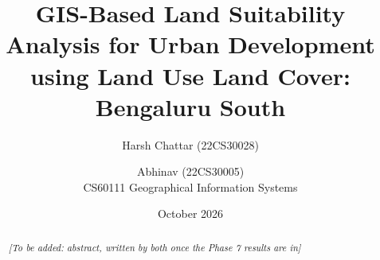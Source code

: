 \documentclass[11pt,a4paper]{article}
\title{GIS-Based Land Suitability Analysis for Urban Development\\
       using Land Use Land Cover: Bengaluru South}
\author{Harsh Chattar (22CS30028) \and Abhinav (22CS30005)\\[0.3em]
  \small CS60111 Geographical Information Systems}
\date{October 2026}
\newcommand{\todo}[1]{\textcolor{red!70!black}{\textit{[To be added: #1]}}}
\begin{document}
\maketitle

\begin{abstract}
\todo{abstract, written by both once the Phase 7 results are in}
\end{abstract}

\tableofcontents
\newpage













\end{document}
